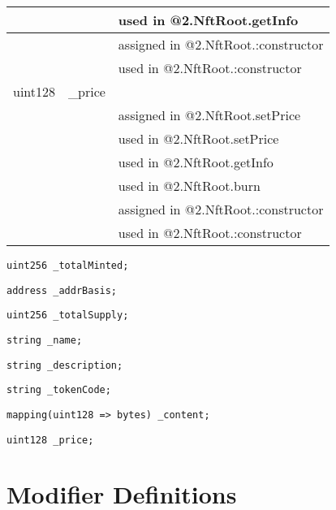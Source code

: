 \begin{tabular}{|l|l|p{5cm}|}
 & & used in @2.NftRoot.getInfo\\\hline
 & & assigned in @2.NftRoot.:constructor\\\hline
 & & used in @2.NftRoot.:constructor\\\hline
uint128 & \_{}price &  \\\hline
 & & assigned in @2.NftRoot.setPrice\\\hline
 & & used in @2.NftRoot.setPrice\\\hline
 & & used in @2.NftRoot.getInfo\\\hline
 & & used in @2.NftRoot.burn\\\hline
 & & assigned in @2.NftRoot.:constructor\\\hline
 & & used in @2.NftRoot.:constructor\\\hline
\end{tabular}
\fi


\begin{lstlisting}[firstnumber=18]
    uint256 _totalMinted;
\end{lstlisting}

\begin{lstlisting}[firstnumber=19]
    address _addrBasis;
\end{lstlisting}

\begin{lstlisting}[firstnumber=21]
    uint256 _totalSupply;
\end{lstlisting}

\begin{lstlisting}[firstnumber=23]
    string _name;
\end{lstlisting}

\begin{lstlisting}[firstnumber=24]
    string _description;
\end{lstlisting}

\begin{lstlisting}[firstnumber=25]
    string _tokenCode;
\end{lstlisting}

\begin{lstlisting}[firstnumber=28]
    mapping(uint128 => bytes) _content;
\end{lstlisting}

\begin{lstlisting}[firstnumber=30]
    uint128 _price;
\end{lstlisting}

\section{Modifier Definitions}


